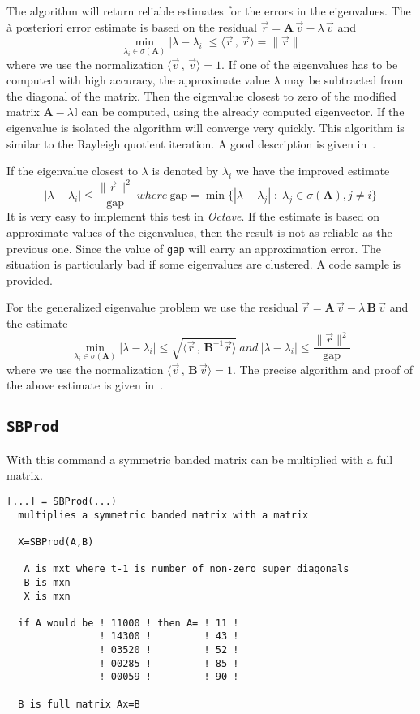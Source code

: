 \documentclass[11pt]{article}
\newcommand{\text}[1]{\ #1 \ }
\newcommand{\id}{\mathbb{I}}
\newcommand{\dfrac}{\frac}
\newcommand{\Octave}{\textit{Octave}}
\begin{document}
The algorithm will return reliable estimates for the errors in the eigenvalues.
The \`a posteriori error estimate is based on the
residual $\vec r = \mathbf{A}\,\vec v -\lambda\,\vec v$ and
\[ \min_{\lambda_i\in\sigma(\mathbf{A})}|\lambda-\lambda_i|\leq 
  \langle \vec r\,,\,\vec r\rangle=\|\vec r\|\]
where we use the normalization $\langle \vec v\,,\,\vec v\rangle =1$.
If one of the eigenvalues has to be computed with high accuracy, the
approximate value $\lambda$ may be subtracted from the diagonal of the matrix.
Then the eigenvalue closest to zero of the modified matrix
$\mathbf{A}-\lambda\id$ can be computed, using the already computed
eigenvector. If the eigenvalue is isolated the algorithm will converge very
quickly. This algorithm is similar to the Rayleigh 
 quotient iteration. A good description is
given in~\cite{GoluVanLoan96}.
\medskip

If the eigenvalue closest to $\lambda$ is denoted by $\lambda_i$ we have
the improved estimate
\[ |\lambda-\lambda_i|\leq  \dfrac{\|\vec r\|^2}{\mbox{gap}}\text{where}
 \mbox{gap}=\min\{|\lambda-\lambda_j|\;:\;
  \lambda_j\in\sigma(\mathbf{A}),j\neq i\} \]
It is very easy to implement this test in \Octave{}. If the estimate is
based on approximate values of the eigenvalues, then the result is not as
reliable as the previous one. Since the value of \texttt{gap} will carry an
approximation error. The situation is particularly bad if some eigenvalues are
clustered. A code  sample is provided.

\bigskip

For the generalized eigenvalue problem 
we use the residual
$\vec r = \mathbf{A}\,\vec v -\lambda\,\mathbf{B}\,\vec v$
and the estimate
\[ \min_{\lambda_i\in\sigma(\mathbf{A})}|\lambda-\lambda_i|\leq 
  \sqrt{\langle \vec r\,,\,\mathbf{B}^{-1}\vec r\rangle}\text{and}
|\lambda-\lambda_i|\leq  \dfrac{\|\vec r\|^2}{\mbox{gap}}\]
where we use the normalization 
$\langle \vec v\,,\,\mathbf{B}\,\vec v\rangle =1$.
The precise algorithm and proof of the above estimate is given
in~\cite{VarFem}.

\subsection{\texttt{SBProd}}
With this command a symmetric banded matrix can be multiplied with a full
matrix.
\begin{verbatim}
[...] = SBProd(...)
  multiplies a symmetric banded matrix with a matrix

  X=SBProd(A,B)

   A is mxt where t-1 is number of non-zero super diagonals
   B is mxn
   X is mxn

  if A would be ! 11000 ! then A= ! 11 ! 
                ! 14300 !         ! 43 ! 
                ! 03520 !         ! 52 ! 
                ! 00285 !         ! 85 ! 
                ! 00059 !         ! 90 ! 

  B is full matrix Ax=B
\end{verbatim}
\end{document}
